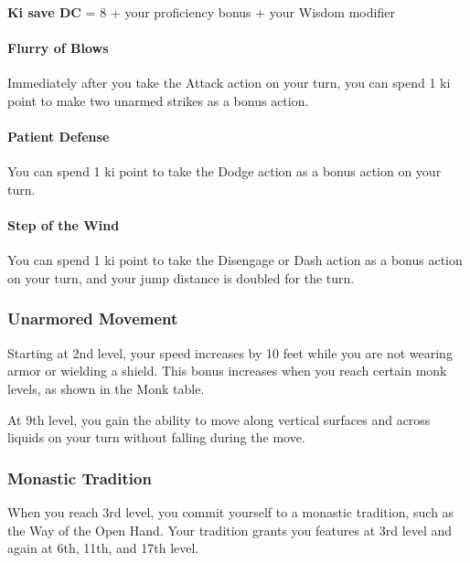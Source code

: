 \documentclass[
]{article}
\begin{document}
\textbf{Ki save DC} = 8 + your proficiency bonus + your Wisdom modifier

\hypertarget{flurry-of-blows}{%
\paragraph{Flurry of Blows}\label{flurry-of-blows}}

Immediately after you take the Attack action on your turn, you can spend
1 ki point to make two unarmed strikes as a bonus action.

\hypertarget{patient-defense}{%
\paragraph{Patient Defense}\label{patient-defense}}

You can spend 1 ki point to take the Dodge action as a bonus action on
your turn.

\hypertarget{step-of-the-wind}{%
\paragraph{Step of the Wind}\label{step-of-the-wind}}

You can spend 1 ki point to take the Disengage or Dash action as a bonus
action on your turn, and your jump distance is doubled for the turn.

\hypertarget{unarmored-movement}{%
\subsubsection{Unarmored Movement}\label{unarmored-movement}}

Starting at 2nd level, your speed increases by 10 feet while you are not
wearing armor or wielding a shield. This bonus increases when you reach
certain monk levels, as shown in the Monk table.

At 9th level, you gain the ability to move along vertical surfaces and
across liquids on your turn without falling during the move.

\hypertarget{monastic-tradition}{%
\subsubsection{Monastic Tradition}\label{monastic-tradition}}

When you reach 3rd level, you commit yourself to a monastic tradition,
such as the Way of the Open Hand. Your tradition grants you features at
3rd level and again at 6th, 11th, and 17th level.
\end{document}
